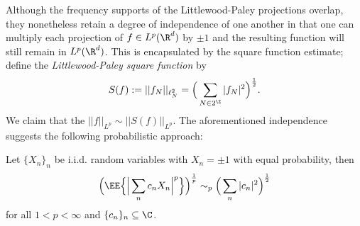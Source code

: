 Although the frequency supports of the Littlewood-Paley projections overlap, they nonetheless retain a degree of independence of one another in that one can multiply each projection of $f \in L^p (\R^d)$ by $\pm 1$ and the resulting function will still remain in $L^p (\R^d)$. This is encapsulated by the square function estimate; define the \emph{Littlewood-Paley square function} by
	\[ S(f) := ||f_N||_{\ell^2_N} = \Big( \sum_{N \in 2^\Z} |f_N|^2 \Big)^\frac12. \]	 
We claim that the $||f||_{L^p} \sim ||S(f)||_{L^p}$. The aforementioned independence suggests the following probabilistic approach:	

\begin{lemma}
	Let $\{ X_n \}_n$ be i.i.d. random variables with $X_n = \pm 1$ with equal probability, then 
		\[ \Big( \EE \Big\{ \Big| \sum_n c_n X_n \Big|^p \Big\}  \Big)^\frac1p \sim_p \Big( \sum_n |c_n|^2\Big)^\frac12 \]
	for all $1 < p < \infty$ and $\{c_n\}_n \subseteq \C$. 	
\end{lemma}

